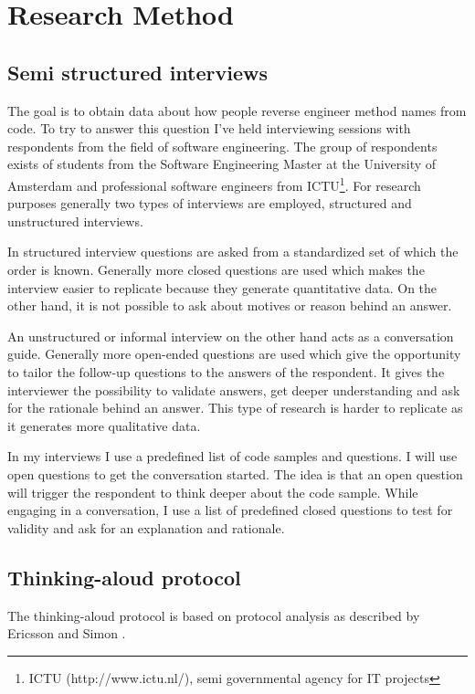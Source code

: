 \section{Research Method}

\subsection{Semi structured interviews}
The goal is to obtain data about how people reverse engineer method names from code. To try to answer this question I've held interviewing sessions with respondents from the field of software engineering. The group of respondents exists of students from the Software Engineering Master at the University of Amsterdam and professional software engineers from ICTU\footnote{ICTU (http://www.ictu.nl/), semi governmental agency for IT projects}. For research purposes generally two types of interviews are employed, structured and unstructured interviews.

In structured interview questions are asked from a standardized set of which the order is known. Generally more closed questions are used which makes the interview easier to replicate because they generate quantitative data. On the other hand, it is not possible to ask about motives or reason behind an answer.

An unstructured or informal interview on the other hand acts as a conversation guide. Generally more open-ended questions are used which give the opportunity to tailor the follow-up questions to the answers of the respondent. It gives the interviewer the possibility to validate answers, get deeper understanding and ask for the rationale behind an answer. This type of research is harder to replicate as it generates more qualitative data.

In my interviews I use a predefined list of code samples and questions. I will use open questions to get the conversation started. The idea is that an open question will trigger the respondent to think deeper about the code sample. While engaging in a conversation, I use a list of predefined closed questions to test for validity and ask for an explanation and rationale.

\subsection{Thinking-aloud protocol}
The thinking-aloud protocol is based on protocol analysis as described by Ericsson and Simon \citationNeeded.

